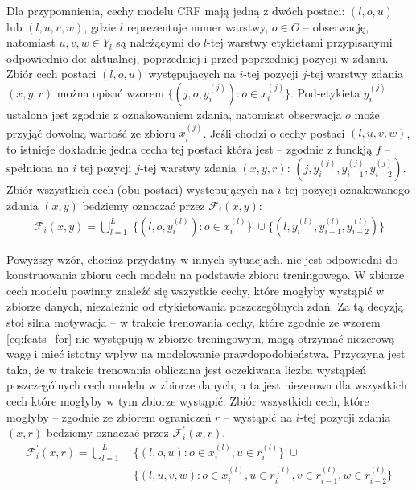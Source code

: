 \documentclass[a4paper,10]{article}
\begin{document}
Dla przypomnienia, cechy modelu CRF mają jedną z dwóch postaci:
$(l, o, u)$ lub $(l, u, v, w)$, gdzie $l$
reprezentuje numer warstwy, $o \in O$ -- obserwację,
natomiast $u, v, w \in Y_l$ są należącymi do $l$-tej
warstwy etykietami przypisanymi odpowiednio do:
aktualnej, poprzedniej i przed-poprzedniej pozycji w zdaniu.
Zbiór cech postaci $(l, o, u)$ występujących na $i$-tej pozycji $j$-tej
warstwy zdania $(x, y, r)$ można opisać wzorem
$\lbrace (j, o, y^{(j)}_i) : o \in x^{(j)}_i \rbrace$.
Pod-etykieta $y^{(j)}_i$ ustalona jest zgodnie z oznakowaniem zdania,
natomiast obserwacja $o$ może przyjąć dowolną wartość ze zbioru
$x^{(j)}_i$. Jeśli chodzi o cechy postaci $(l, u, v, w)$, to
istnieje dokładnie jedna cecha tej postaci która jest -- zgodnie z funckją
$f$ -- spełniona na $i$ tej pozycji $j$-tej warstwy zdania $(x, y, r)$:
$(j, y^{(j)}_i, y^{(j)}_{i-1}, y^{(j)}_{i-2})$.
Zbiór wszystkich cech (obu postaci) występujących na $i$-tej pozycji
oznakowanego zdania $(x, y)$ bedziemy oznaczać przez $\mathcal F_i(x, y)$:
\begin{align}\label{eq:feats_for}
\mathcal F_i(x, y) = \bigcup_{l=1}^L \;
\lbrace (l, o, y^{(l)}_i) : o \in x^{(l)}_i \rbrace
\; \cup
\lbrace (l, y^{(l)}_i, y^{(l)}_{i-1}, y^{(l)}_{i-2}) \rbrace
\end{align}

Powyższy wzór, chociaż przydatny w innych sytuacjach, nie jest
odpowiedni do konstruowania zbioru cech modelu na podstawie
zbioru treningowego.
W zbiorze cech modelu powinny znaleźć się wszystkie cechy, które
mogłyby wystąpić w zbiorze danych, niezależnie od etykietowania
poszczególnych zdań.
Za tą decyzją stoi silna motywacja -- w trakcie trenowania cechy,
które zgodnie ze wzorem \ref{eq:feats_for} nie występują w zbiorze
treningowym, mogą otrzymać niezerową wagę i mieć istotny wpływ na
modelowanie prawdopodobieństwa. Przyczyna jest taka, że w trakcie 
trenowania obliczana jest oczekiwana liczba wystąpień poszczególnych
cech modelu w zbiorze danych, a ta jest niezerowa dla wszystkich cech
które mogłyby w tym zbiorze wystąpić.
Zbiór wszystkich cech, które mogłyby -- zgodnie ze zbiorem ograniczeń $r$
-- wystąpić na $i$-tej pozycji zdania $(x, r)$ bedziemy oznaczać przez
$\mathcal F^\prime_i(x, r)$.
\begin{align}\label{eq:feats'_for}
\mathcal F^\prime_i(x, r) = \bigcup_{l=1}^L \;
&\lbrace (l, o, u) : o \in x^{(l)}_i, u \in r^{(l)}_i \rbrace
\; \cup \\
&\lbrace (l, u, v, w) : o \in x^{(l)}_i,
u \in r^{(l)}_i, v \in r^{(l)}_{i-1},
w \in r^{(l)}_{i-2}
\rbrace \nonumber
\end{align}
\end{document}
